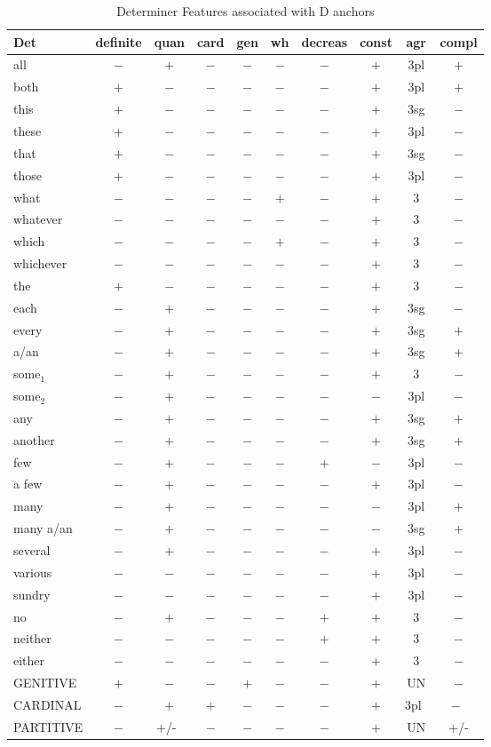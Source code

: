 \begin{table}
\centering
\begin{tabular}{|l||c|c|c|c|c|c|c|c|c|}
\hline
Det&definite&quan&card&gen&wh&decreas&const&agr&compl\\
\hline
\hline
all&$-$&$+$&$-$&$-$&$-$&$-$&$+$&3pl&$+$\\
both&$+$&$-$&$-$&$-$&$-$&$-$&$+$&3pl&$+$\\
this&$+$&$-$&$-$&$-$&$-$&$-$&$+$&3sg&$-$\\
these&$+$&$-$&$-$&$-$&$-$&$-$&$+$&3pl&$-$\\
that&$+$&$-$&$-$&$-$&$-$&$-$&$+$&3sg&$-$\\
those&$+$&$-$&$-$&$-$&$-$&$-$&$+$&3pl&$-$\\
what&$-$&$-$&$-$&$-$&$+$&$-$&$+$&3&$-$\\
whatever&$-$&$-$&$-$&$-$&$-$&$-$&$+$&3&$-$\\
which&$-$&$-$&$-$&$-$&$+$&$-$&$+$&3&$-$\\
whichever&$-$&$-$&$-$&$-$&$-$&$-$&$+$&3&$-$\\
the&$+$&$-$&$-$&$-$&$-$&$-$&$+$&3&$-$\\
each&$-$&$+$&$-$&$-$&$-$&$-$&$+$&3sg&$-$\\
every&$-$&$+$&$-$&$-$&$-$&$-$&$+$&3sg&$+$\\
a/an&$-$&$+$&$-$&$-$&$-$&$-$&$+$&3sg&$+$\\
some$_{1}$&$-$&$+$&$-$&$-$&$-$&$-$&$+$&3&$-$\\
some$_{2}$&$-$&$+$&$-$&$-$&$-$&$-$&$-$&3pl&$-$\\
any&$-$&$+$&$-$&$-$&$-$&$-$&$+$&3sg&$+$\\
another&$-$&$+$&$-$&$-$&$-$&$-$&$+$&3sg&$+$\\
few&$-$&$+$&$-$&$-$&$-$&$+$&$-$&3pl&$-$\\
a few&$-$&$+$&$-$&$-$&$-$&$-$&$+$&3pl&$-$\\
many&$-$&$+$&$-$&$-$&$-$&$-$&$-$&3pl&$+$\\
many a/an&$-$&$+$&$-$&$-$&$-$&$-$&$-$&3sg&$+$\\
several&$-$&$+$&$-$&$-$&$-$&$-$&$+$&3pl&$-$\\
various&$-$&$-$&$-$&$-$&$-$&$-$&$+$&3pl&$-$\\
sundry&$-$&$-$&$-$&$-$&$-$&$-$&$+$&3pl&$-$\\
no&$-$&$+$&$-$&$-$&$-$&$+$&$+$&3&$-$\\
neither&$-$&$-$&$-$&$-$&$-$&$+$&$+$&3&$-$\\
either&$-$&$-$&$-$&$-$&$-$&$-$&$+$&3&$-$\\
\hline
\hline
GENITIVE&$+$&$-$&$-$&$+$&$-$&$-$&$+$&UN\footnotemark&$-$\\
CARDINAL&$-$&$+$&$+$&$-$&$-$&$-$&$+$&3pl\footnotemark\ &$-$\footnotemark\ \\
PARTITIVE&$-$&+/-\footnotemark\ &$-$&$-$&$-$&$-$&$+$&UN&+/-\\
\hline
\end{tabular}
 \caption{Determiner Features associated with D anchors}
\label{det-values}
\end{table}
